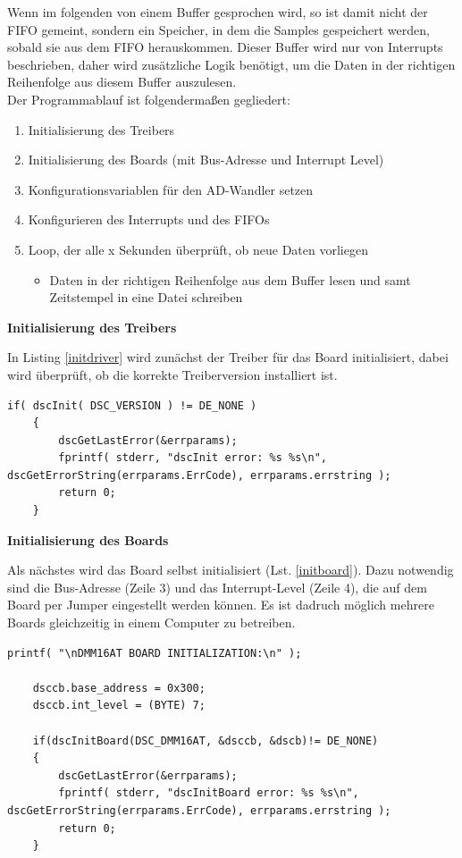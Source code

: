 \documentclass[12pt,a4paper]{scrartcl}
\begin{document}
Wenn im folgenden von einem Buffer gesprochen wird, so ist damit nicht der FIFO gemeint, sondern ein Speicher, in dem die Samples gespeichert werden, sobald sie aus dem FIFO herauskommen. Dieser Buffer wird nur von Interrupts beschrieben, daher wird zusätzliche Logik benötigt, um die Daten in der richtigen Reihenfolge aus diesem Buffer auszulesen. \\

Der Programmablauf ist folgendermaßen gegliedert:

\begin{enumerate}
	\item Initialisierung des Treibers
	\item Initialisierung des Boards (mit Bus-Adresse und Interrupt Level)
	\item Konfigurationsvariablen für den AD-Wandler setzen
	\item Konfigurieren des Interrupts und des FIFOs
	\item Loop, der alle x Sekunden überprüft, ob neue Daten vorliegen
		\begin{itemize}
			\item Daten in der richtigen Reihenfolge aus dem Buffer lesen und samt Zeitstempel in eine Datei schreiben
		\end{itemize}
\end{enumerate}




\textbf{Initialisierung des Treibers}

In Listing \ref{initdriver} wird zunächst der Treiber für das Board initialisiert, dabei wird überprüft, ob die korrekte Treiberversion installiert ist.
\begin{lstlisting}[frame=trBL]
	if( dscInit( DSC_VERSION ) != DE_NONE )
	{
		dscGetLastError(&errparams);
		fprintf( stderr, "dscInit error: %s %s\n", dscGetErrorString(errparams.ErrCode), errparams.errstring );
		return 0;
	}
\end{lstlisting}


\textbf{Initialisierung des Boards}

Als nächstes wird das Board selbst initialisiert (Lst. \ref{initboard}). Dazu notwendig sind die Bus-Adresse (Zeile 3) und das Interrupt-Level (Zeile 4), die auf dem Board per Jumper eingestellt werden können. Es ist dadruch möglich mehrere Boards gleichzeitig in einem Computer zu betreiben.

\begin{lstlisting}[frame=trBL]
	printf( "\nDMM16AT BOARD INITIALIZATION:\n" );

	dsccb.base_address = 0x300;
	dsccb.int_level = (BYTE) 7;

	if(dscInitBoard(DSC_DMM16AT, &dsccb, &dscb)!= DE_NONE)
	{
		dscGetLastError(&errparams);
		fprintf( stderr, "dscInitBoard error: %s %s\n", dscGetErrorString(errparams.ErrCode), errparams.errstring );
		return 0;
	}
\end{lstlisting}
\end{document}
